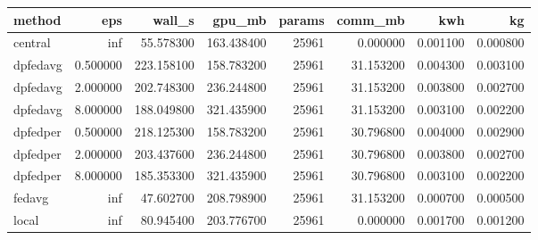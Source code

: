 \begin{tabular}{lrrrrrrr}
\toprule
method & eps & wall_s & gpu_mb & params & comm_mb & kwh & kg \\
\midrule
central & inf & 55.578300 & 163.438400 & 25961 & 0.000000 & 0.001100 & 0.000800 \\
dpfedavg & 0.500000 & 223.158100 & 158.783200 & 25961 & 31.153200 & 0.004300 & 0.003100 \\
dpfedavg & 2.000000 & 202.748300 & 236.244800 & 25961 & 31.153200 & 0.003800 & 0.002700 \\
dpfedavg & 8.000000 & 188.049800 & 321.435900 & 25961 & 31.153200 & 0.003100 & 0.002200 \\
dpfedper & 0.500000 & 218.125300 & 158.783200 & 25961 & 30.796800 & 0.004000 & 0.002900 \\
dpfedper & 2.000000 & 203.437600 & 236.244800 & 25961 & 30.796800 & 0.003800 & 0.002700 \\
dpfedper & 8.000000 & 185.353300 & 321.435900 & 25961 & 30.796800 & 0.003100 & 0.002200 \\
fedavg & inf & 47.602700 & 208.798900 & 25961 & 31.153200 & 0.000700 & 0.000500 \\
local & inf & 80.945400 & 203.776700 & 25961 & 0.000000 & 0.001700 & 0.001200 \\
\bottomrule
\end{tabular}
